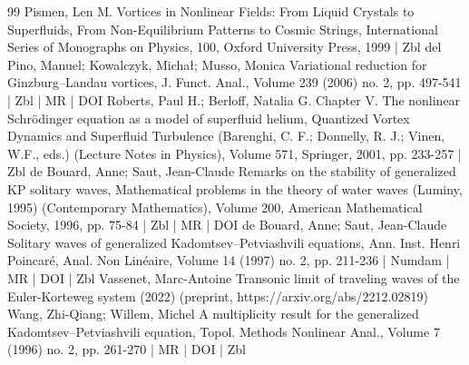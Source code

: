 \begin{thebibliography}{99}
Pismen, Len M. Vortices in Nonlinear Fields: From Liquid Crystals to Superfluids, From Non-Equilibrium Patterns to Cosmic Strings, International Series of Monographs on Physics, 100, Oxford University Press, 1999 | Zbl
del Pino, Manuel; Kowalczyk, Michał; Musso, Monica Variational reduction for Ginzburg–Landau vortices, J. Funct. Anal., Volume 239 (2006) no. 2, pp. 497-541 | Zbl | MR | DOI
Roberts, Paul H.; Berloff, Natalia G. Chapter V. The nonlinear Schrödinger equation as a model of superfluid helium, Quantized Vortex Dynamics and Superfluid Turbulence (Barenghi, C. F.; Donnelly, R. J.; Vinen, W.F., eds.) (Lecture Notes in Physics), Volume 571, Springer, 2001, pp. 233-257 | Zbl
de Bouard, Anne; Saut, Jean-Claude Remarks on the stability of generalized KP solitary waves, Mathematical problems in the theory of water waves (Luminy, 1995) (Contemporary Mathematics), Volume 200, American Mathematical Society, 1996, pp. 75-84 | Zbl | MR | DOI
de Bouard, Anne; Saut, Jean-Claude Solitary waves of generalized Kadomtsev–Petviashvili equations, Ann. Inst. Henri Poincaré, Anal. Non Linéaire, Volume 14 (1997) no. 2, pp. 211-236 | Numdam | MR | DOI | Zbl
Vassenet, Marc-Antoine Transonic limit of traveling waves of the Euler-Korteweg system (2022) (preprint, https://arxiv.org/abs/2212.02819)
Wang, Zhi-Qiang; Willem, Michel A multiplicity result for the generalized Kadomtsev–Petviashvili equation, Topol. Methods Nonlinear Anal., Volume 7 (1996) no. 2, pp. 261-270 | MR | DOI | Zbl
\end{thebibliography}
